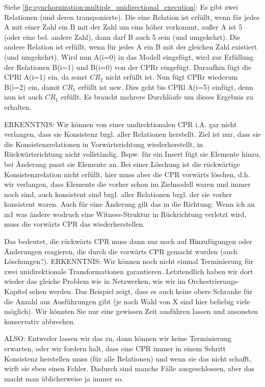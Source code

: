 Siehe \autoref{fig:synchornization:multiple_unidirectional_execution}: Es gibt zwei Relationen (und deren transponierte). Die eine Relation ist erfüllt, wenn für jedes A mit einer Zahl ein B mit der Zahl um eins höher vorkommt, außer A ist 5 (oder eine bel. andere Zahl), dann darf B auch 5 sein (und umgekehrt). Die andere Relation ist erfüllt, wenn für jedes A ein B mit der gleichen Zahl existiert (und umgekehrt).
Wird nun A(i=0) in das Modell eingefügt, wird zur Erfüllung der Relationen B(i=1) und B(i=0) von der CPRr eingefügt.
Daraufhin fügt die CPRl A(i=1) ein, da sonst $CR_2$ nicht erfüllt ist.
Nun fügt CPRr wiederum B(i=2) ein, damit $CR_1$ erfüllt ist usw.
Dies geht bis CPRl A(i=5) einfügt, denn nun ist auch $CR_1$ erfüllt.
Es braucht mehrere Durchläufe um dieses Ergebnis zu erhalten.

ERKENNTNIS: Wir können von einer undirektionalen CPR i.A. gar nicht verlangen, dass sie Konsistenz bzgl. aller Relationen herstellt.
Ziel ist nur, dass sie die Konsistenzrelationen in Vorwärtsrichtung wiederherstellt, in Rückwärtsrichtung nicht vollständig.
Bspw. für ein Insert fügt sie Elemente hinzu, bei Änderung passt sie Elemente an. Bei einer Löschung ist die rückwärtige Konsistenzrelation nicht erfüllt, hier muss aber die CPR vorwärts löschen, d.h. wir verlangen, dass Elemente die vorher schon im Zielmodell waren und immer noch sind, auch konsistent sind bzgl. aller Relationen bzgl. der sie vorher konsistent waren.
Auch für eine Änderung gilt das in die Richtung: Wenn ich an m1 was ändere wodruch eine Witness-Struktur in Rückrichtung verletzt wird, muss die vorwärts CPR das wiederherstellen.

Das bedeutet, die rückwärts CPR muss dann nur noch auf Hinzufügungen oder Änderungen reagieren, die durch die vorwärts CPR gemacht wurden (auch Löschungen?).
ERKENNTNIS: Wir können noch nicht einmal Terminierung für zwei unidirektionale Transformationen garantieren. Letztendlich haben wir dort wieder das gleiche Problem wie in Netzwerken, wie wir im Orchestrierungs-Kapitel sehen werden. Das Beispiel zeigt, dass es auch keine obere Schranke für die Anzahl aus Ausführungen gibt (je nach Wahl von X sind hier beliebig viele möglich). Wir könnten Sie nur eine gewissen Zeit ausführen lassen und ansonsten konservativ abbrechen.

ALSO: Entweder lassen wir das zu, dann können wir keine Terminierung erwarten, oder wir fordern halt, dass eine CPR immer in einem Schritt Konsistenz herstellen muss (für alle Relationen) und wenn sie das nicht schafft, wirft sie eben einen Fehler. Dadurch sind manche Fälle ausgeschlossen, aber das macht man üblicherweise ja immer so.

